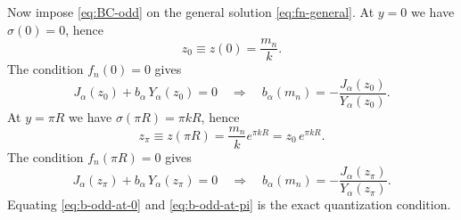 \documentclass[11pt]{article}
\begin{document}
Now impose \eqref{eq:BC-odd} on the general solution \eqref{eq:fn-general}.
At $y=0$ we have $\sigma(0)=0$, hence
\begin{equation}
z_0\equiv z(0)=\frac{m_n}{k}.
\label{eq:z0-def}
\end{equation}
The condition $f_n(0)=0$ gives
\begin{equation}
J_\alpha(z_0)+b_\alpha\,Y_\alpha(z_0)=0
\quad\Longrightarrow\quad
b_\alpha(m_n)=-\frac{J_\alpha(z_0)}{Y_\alpha(z_0)}.
\label{eq:b-odd-at-0}
\end{equation}
At $y=\pi R$ we have $\sigma(\pi R)=\pi kR$, hence
\begin{equation}
z_\pi \equiv z(\pi R)=\frac{m_n}{k}e^{\pi kR}=z_0\,e^{\pi kR}.
\label{eq:zpi-def}
\end{equation}
The condition $f_n(\pi R)=0$ gives
\begin{equation}
J_\alpha(z_\pi)+b_\alpha\,Y_\alpha(z_\pi)=0
\quad\Longrightarrow\quad
b_\alpha(m_n)=-\frac{J_\alpha(z_\pi)}{Y_\alpha(z_\pi)}.
\label{eq:b-odd-at-pi}
\end{equation}
Equating \eqref{eq:b-odd-at-0} and \eqref{eq:b-odd-at-pi} is the exact quantization condition.
\end{document}
